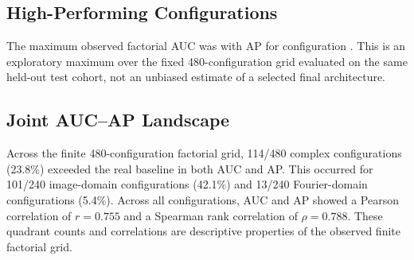 \subsection{High-Performing Configurations}
The maximum observed factorial AUC was \BestAUC with AP \BestAP for configuration \texttt{\BestLabel}. This is an exploratory maximum over the fixed 480-configuration grid evaluated on the same held-out test cohort, not an unbiased estimate of a selected final architecture.

\subsection{Joint AUC--AP Landscape}

Across the finite 480-configuration factorial grid, 114/480 complex configurations (23.8\%) exceeded the real baseline in both AUC and AP. This occurred for 101/240 image-domain configurations (42.1\%) and 13/240 Fourier-domain configurations (5.4\%). Across all configurations, AUC and AP showed a Pearson correlation of $r=0.755$ and a Spearman rank correlation of $\rho=0.788$. These quadrant counts and correlations are descriptive properties of the observed finite factorial grid.
